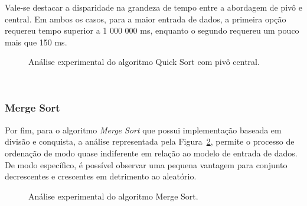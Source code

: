 \documentclass[conference]{IEEEtran}
\begin{document}
Vale-se destacar a disparidade na grandeza de tempo entre a abordagem de pivô e central. Em ambos os casos, para a maior entrada de dados, a primeira opção requereu tempo superior a 1 000 000 ms, enquanto o segundo requereu um pouco mais que 150 ms.

\begin{figure}
\label{image: graph-quick-central}

\caption{Análise experimental do algoritmo Quick Sort com pivô central.}
\end{figure}

~\\
\subsubsection{Merge Sort}

Por fim, para o algoritmo \textit{Merge Sort} que possui implementação baseada em divisão e conquista, a análise representada pela Figura~\ref{image: graph-merge}, permite o processo de ordenação de modo quase indiferente em relação ao modelo de entrada de dados. De modo específico, é possível observar uma pequena vantagem para conjunto decrescentes e crescentes em detrimento ao aleatório.

\begin{figure}

\centering
{}
\caption{Análise experimental do algoritmo Merge Sort.}
\label{image: graph-merge}
\end{figure}
\end{document}
